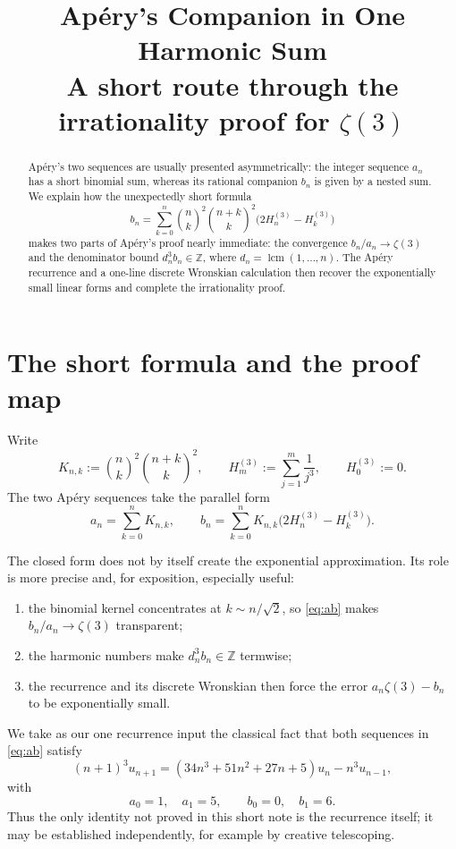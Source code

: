 \documentclass[11pt]{article}
\title{\textbf{Apéry's Companion in One Harmonic Sum}\\
\large A short route through the irrationality proof for \(\zeta(3)\)}
\author{}
\date{}
\theoremstyle{remark}
\newcommand{\HH}[2]{H_{#1}^{(#2)}}
\newcommand{\zetaThree}{\zeta(3)}
\newcommand{\lcm}{\operatorname{lcm}}
\begin{document}
\maketitle

\begin{abstract}
Apéry's two sequences are usually presented asymmetrically: the integer
sequence \(a_n\) has a short binomial sum, whereas its rational companion
\(b_n\) is given by a nested sum.  We explain how the unexpectedly short
formula
\[
 b_n=\sum_{k=0}^n
 \binom nk^2\binom{n+k}{k}^2
 \bigl(2\HH n3-\HH k3\bigr)
\]
makes two parts of Apéry's proof nearly immediate: the convergence
\(b_n/a_n\to\zetaThree\) and the denominator bound
\(d_n^3b_n\in\mathbb Z\), where \(d_n=\lcm(1,\ldots,n)\).
The Apéry recurrence and a one-line discrete Wronskian calculation then
recover the exponentially small linear forms and complete the irrationality
proof.
\end{abstract}

\section{The short formula and the proof map}

Write
\[
 K_{n,k}:=\binom nk^2\binom{n+k}{k}^2,
 \qquad
 \HH m3:=\sum_{j=1}^m\frac1{j^3},
 \qquad \HH 03:=0.
\]
The two Apéry sequences take the parallel form
\begin{equation}\label{eq:ab}
 a_n=\sum_{k=0}^nK_{n,k},
 \qquad
 b_n=\sum_{k=0}^nK_{n,k}
       \bigl(2\HH n3-\HH k3\bigr).
\end{equation}

The closed form does not by itself create the exponential approximation.
Its role is more precise and, for exposition, especially useful:
\begin{enumerate}[label=\textup{(\roman*)}]
 \item the binomial kernel concentrates at \(k\sim n/\sqrt2\), so
       \eqref{eq:ab} makes \(b_n/a_n\to\zetaThree\) transparent;
 \item the harmonic numbers make \(d_n^3b_n\in\mathbb Z\) termwise;
 \item the recurrence and its discrete Wronskian then force the error
       \(a_n\zetaThree-b_n\) to be exponentially small.
\end{enumerate}

We take as our one recurrence input the classical fact that both sequences in
\eqref{eq:ab} satisfy
\begin{equation}\label{eq:recurrence}
 (n+1)^3u_{n+1}
 =
 (34n^3+51n^2+27n+5)u_n-n^3u_{n-1},
\end{equation}
with
\[
 a_0=1,\quad a_1=5,
 \qquad
 b_0=0,\quad b_1=6.
\]
Thus the only identity not proved in this short note is the recurrence itself;
it may be established independently, for example by creative telescoping.
\end{document}
